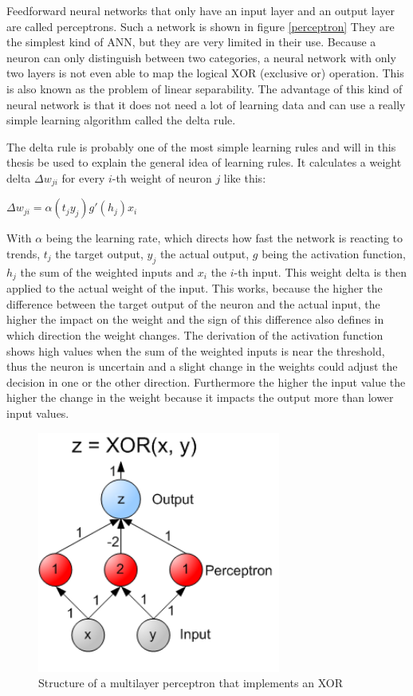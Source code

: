 
Feedforward neural networks that only have an input layer and an output layer are called perceptrons. Such a network is shown in figure \ref{perceptron} They are the simplest kind of ANN, but they are very limited in their use. Because a neuron can only distinguish between two categories, a neural network with only two layers is not even able to map the logical XOR (exclusive or) operation. \cite{Minsky1988} This is also known as the problem of linear separability. The advantage of this kind of neural network is that it does not need a lot of learning data and can use a really simple learning algorithm called the delta rule.

The delta rule is probably one of the most simple learning rules and will in this thesis be used to explain the general idea of learning rules. It calculates a weight delta $\Delta w_{ji}$ for every $i$-th weight of neuron $j$ like this:

\begin{center}
	$\Delta w_{ji} = \alpha (t_j  y_j)g'(h_j)x_i$
\end{center}

With $\alpha$ being the learning rate, which directs how fast the network is reacting to trends, $t_j$ the target output, $y_j$ the actual output, $g$ being the activation function, $h_j$ the sum of the weighted inputs and $x_i$ the $i$-th input. This weight delta is then applied to the actual weight of the input. This works, because the higher the difference between the target output of the neuron and the actual input, the higher the impact on the weight and the sign of this difference also defines in which direction the weight changes. The derivation of the activation function shows high values when the sum of the weighted inputs is near the threshold, thus the neuron is uncertain and a slight change in the weights could adjust the decision in one or the other direction. Furthermore the higher the input value the higher the change in the weight because it impacts the output more than lower input values. \cite{deltaRule}

\begin{figure}[ht]
	\centering
  \includegraphics[width=8cm]{figures/multilayer_XOR}
	\caption[Structure of a multilayer perceptron that implements an XOR]{Structure of a multilayer perceptron that implements an XOR \protect\footnotemark}
	\label{multilayer_XOR}
\end{figure}

